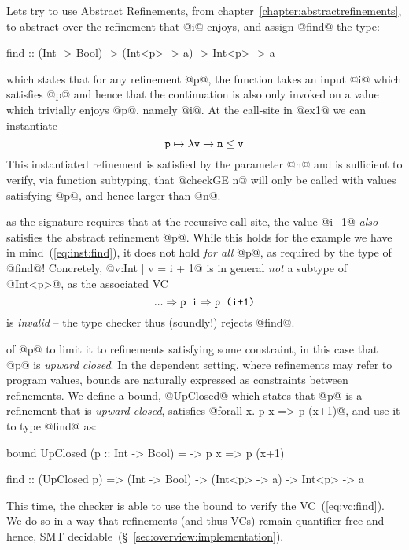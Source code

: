  Lets try to
use Abstract Refinements, from chapter~\ref{chapter:abstractrefinements},
to abstract over the refinement that @i@ enjoys, and
assign @find@ the type:
%
\begin{code}
  find :: (Int -> Bool) -> (Int<p> -> a) -> Int<p> -> a
\end{code}
%
which states that for any refinement @p@, the function takes
an input @i@ which satisfies @p@ and hence that the continuation
is also only invoked on a value which trivially enjoys @p@, namely @i@.
%
At the call-site in @ex1@ we can instantiate
\begin{equation}
\texttt{p} \mapsto \lambda \texttt{v} \rightarrow \texttt{n} \leq \texttt{v} \label{eq:inst:find}
\end{equation}
%
This instantiated refinement is satisfied by the parameter @n@ and is
sufficient to verify, via function subtyping, that @checkGE n@ will
only be called with values satisfying @p@, and hence larger than @n@.

 as the signature requires that
at the recursive call site, the value @i+1@ \emph{also}
satisfies the abstract refinement @p@.
%
While this holds for the example we have in mind~(\ref{eq:inst:find}),
it does not hold \emph{for all} @p@, as required by the type of @find@!
%
Concretely, @{v:Int | v = i + 1}@ is in general \emph{not} a subtype of
@Int<p>@, as the associated VC
%
\begin{equation}
    ... \Rightarrow \texttt{p i} \Rightarrow \texttt{p (i+1)} \label{eq:vc:find}
\end{equation}
%
%
is \emph{invalid} -- the type checker thus (soundly!) rejects @find@.

 of @p@ to limit
it to refinements satisfying some constraint, in this case
that @p@ is \emph{upward closed}. In the dependent setting,
where refinements may refer to program values, bounds
are naturally expressed as constraints between refinements.
%
We define a bound, @UpClosed@
%
which states that @p@ is a refinement that is \emph{upward closed},
\ie satisfies @forall x. p x =>  p (x+1)@,
and use it to type @find@ as:
%
\begin{code}
  bound UpClosed (p :: Int -> Bool)
    = \x -> p x => p (x+1)

  find :: (UpClosed p) => (Int -> Bool)
                       -> (Int<p> -> a)
                       ->  Int<p> -> a
\end{code}
%
This time, the checker is able to use the bound to
verify the VC~(\ref{eq:vc:find}).
%
We do so in a way that refinements (and thus VCs) remain quantifier
free and hence, SMT decidable~(\S~\ref{sec:overview:implementation}).

